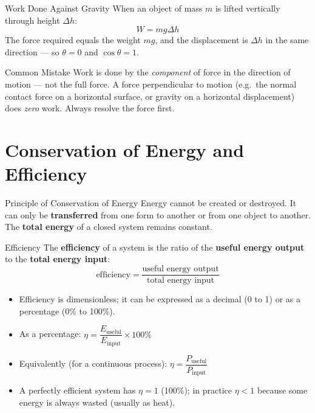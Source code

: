 \begin{keybox}{Work Done Against Gravity}
When an object of mass $m$ is lifted vertically through height $\Delta h$:
$$W = mg\Delta h$$
The force required equals the weight $mg$, and the displacement is $\Delta h$ in the same direction — so $\theta = 0$ and $\cos\theta = 1$.
\end{keybox}

\begin{warningbox}{Common Mistake}
Work is done by the \emph{component} of force in the direction of motion — not the full force. A force perpendicular to motion (e.g.\ the normal contact force on a horizontal surface, or gravity on a horizontal displacement) does \emph{zero} work. Always resolve the force first.
\end{warningbox}

\section{Conservation of Energy and Efficiency}

\begin{definitionbox}{Principle of Conservation of Energy}
Energy cannot be created or destroyed. It can only be \textbf{transferred} from one form to another or from one object to another. The \textbf{total energy} of a closed system remains constant.
\end{definitionbox}

\begin{definitionbox}{Efficiency}
The \textbf{efficiency} of a system is the ratio of the \textbf{useful energy output} to the \textbf{total energy input}:
$$\text{efficiency} = \frac{\text{useful energy output}}{\text{total energy input}}$$
\begin{itemize}[itemsep=2pt]
  \item Efficiency is dimensionless; it can be expressed as a decimal (0 to 1) or as a percentage (0\% to 100\%).
  \item As a percentage: $\eta = \dfrac{E_{\text{useful}}}{E_{\text{input}}} \times 100\%$
  \item Equivalently (for a continuous process): $\eta = \dfrac{P_{\text{useful}}}{P_{\text{input}}}$
  \item A perfectly efficient system has $\eta = 1$ (100\%); in practice $\eta < 1$ because some energy is always wasted (usually as heat).
\end{itemize}
\end{definitionbox}



